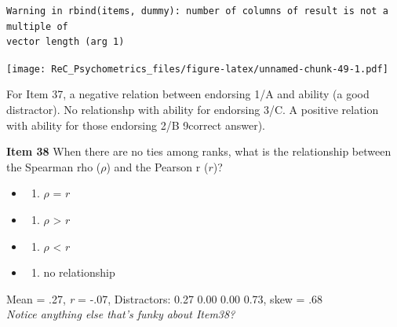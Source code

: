 \documentclass[
  english,
]{book}
\newenvironment{Shaded}{\begin{snugshade}}{\end{snugshade}}
\newcommand{\AttributeTok}[1]{\textcolor[rgb]{0.77,0.63,0.00}{#1}}
\newcommand{\DecValTok}[1]{\textcolor[rgb]{0.00,0.00,0.81}{#1}}
\newcommand{\FunctionTok}[1]{\textcolor[rgb]{0.00,0.00,0.00}{#1}}
\newcommand{\NormalTok}[1]{#1}
\newcommand{\SpecialCharTok}[1]{\textcolor[rgb]{0.00,0.00,0.00}{#1}}
\providecommand{\tightlist}{%
  \setlength{\itemsep}{0pt}\setlength{\parskip}{0pt}}
\begin{document}
\begin{verbatim}
Warning in rbind(items, dummy): number of columns of result is not a multiple of
vector length (arg 1)
\end{verbatim}

\texttt{[image: ReC\_Psychometrics\_files/figure-latex/unnamed-chunk-49-1.pdf]}

For Item 37, a negative relation between endorsing 1/A and ability (a good distractor). No relationshp with ability for endorsing 3/C. A positive relation with ability for those endorsing 2/B 9correct answer).

\textbf{Item 38} When there are no ties among ranks, what is the relationship between the Spearman rho (\(\rho\)) and the Pearson r (\(r\))?

\begin{itemize}
\item
  \begin{enumerate}
  \def\labelenumi{\alph{enumi})}
  \tightlist
  \item
    \(\rho\) = \(r\)
  \end{enumerate}
\item
  \begin{enumerate}
  \def\labelenumi{\roman{enumi})}
  \setcounter{enumi}{1}
  \tightlist
  \item
    \(\rho\) \textgreater{} \(r\)
  \end{enumerate}
\item
  \begin{enumerate}
  \def\labelenumi{\alph{enumi})}
  \tightlist
  \item
    \(\rho\) \textless{} \(r\)
  \end{enumerate}
\item
  \begin{enumerate}
  \def\labelenumi{\alph{enumi})}
  \setcounter{enumi}{1}
  \tightlist
  \item
    no relationship
  \end{enumerate}
\end{itemize}

Mean = .27, \emph{r} = -.07, Distractors: 0.27 0.00 0.00 0.73, skew = .68\\
\emph{Notice anything else that's funky about Item38?}

\begin{Shaded}
\end{Shaded}
\end{document}
